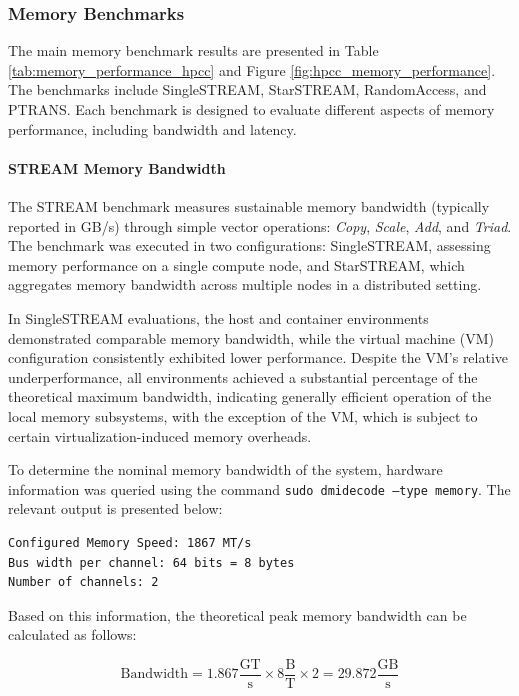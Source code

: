 \subsubsection{Memory Benchmarks}
The main memory benchmark results are presented in Table \ref{tab:memory_performance_hpcc} and Figure \ref{fig:hpcc_memory_performance}. The benchmarks include SingleSTREAM, StarSTREAM, RandomAccess, and PTRANS. Each benchmark is designed to evaluate different aspects of memory performance, including bandwidth and latency.

\paragraph{STREAM Memory Bandwidth}

The STREAM benchmark measures sustainable memory bandwidth (typically reported in GB/s) through simple vector operations: \textit{Copy}, \textit{Scale}, \textit{Add}, and \textit{Triad}. The benchmark was executed in two configurations: SingleSTREAM, assessing memory performance on a single compute node, and StarSTREAM, which aggregates memory bandwidth across multiple nodes in a distributed setting.

In SingleSTREAM evaluations, the host and container environments demonstrated comparable memory bandwidth, while the virtual machine (VM) configuration consistently exhibited lower performance. Despite the VM's relative underperformance, all environments achieved a substantial percentage of the theoretical maximum bandwidth, indicating generally efficient operation of the local memory subsystems, with the exception of the VM, which is subject to certain virtualization-induced memory overheads.

To determine the nominal memory bandwidth of the system, hardware information was queried using the command \texttt{sudo dmidecode --type memory}. The relevant output is presented below:

\begin{verbatim}
Configured Memory Speed: 1867 MT/s
Bus width per channel: 64 bits = 8 bytes
Number of channels: 2
\end{verbatim}

Based on this information, the theoretical peak memory bandwidth can be calculated as follows:

\begin{equation*}
\text{Bandwidth} = 1.867 \frac{\text{GT}}{\text{s}} \times 8 \frac{\text{B}}{\text{T}} \times 2 = 29.872 \frac{\text{GB}}{\text{s}}
\end{equation*}

